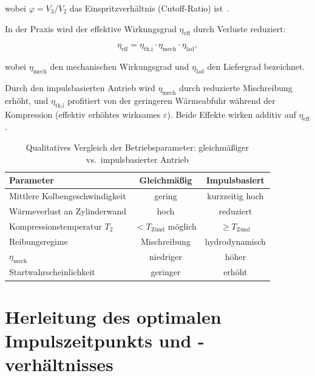 ﻿\documentclass[a4paper,12pt]{article}
\begin{document}
\noindent
wobei $\varphi = V_3 / V_2$ das Einspritzverhältnis (Cutoff-Ratio) ist~\cite{heywood1988}.

In der Praxis wird der effektive Wirkungsgrad $\eta_\text{eff}$ durch Verluste
reduziert:

\begin{equation}
  \eta_\text{eff} = \eta_\text{th,i} \cdot \eta_\text{mech} \cdot \eta_\text{lad},
  \label{eq:eta_eff}
\end{equation}

\noindent
wobei $\eta_\text{mech}$ den mechanischen Wirkungsgrad und $\eta_\text{lad}$
den Liefergrad bezeichnet.

Durch den impulsbasierten Antrieb wird $\eta_\text{mech}$ durch reduzierte
Mischreibung erhöht, und $\eta_\text{th,i}$ profitiert von der geringeren
Wärmeabfuhr während der Kompression (effektiv erhöhtes \glqq wirksames\grqq{}
$\varepsilon$). Beide Effekte wirken additiv auf $\eta_\text{eff}$.

\begin{table}[h]
\centering
\caption{Qualitatives Vergleich der Betriebsparameter: gleichmäßiger vs.\
impulsbasierter Antrieb}
\label{tab:vergleich}
\begin{tabular}{lcc}
\toprule
\textbf{Parameter} & \textbf{Gleichmäßig} & \textbf{Impulsbasiert} \\
\midrule
Mittlere Kolbengeschwindigkeit & gering & kurzzeitig hoch \\
Wärmeverlust an Zylinderwand   & hoch   & reduziert \\
Kompressionstemperatur $T_2$   & $< T_\text{Zünd}$ möglich & $\geq T_\text{Zünd}$ \\
Reibungsregime                 & Mischreibung & hydrodynamisch \\
$\eta_\text{mech}$             & niedriger & höher \\
Startwahrscheinlichkeit        & geringer & erhöht \\
\bottomrule
\end{tabular}
\end{table}

\section{Herleitung des optimalen Impulszeitpunkts und -verhältnisses}
\label{sec:optimum}
\end{document}

